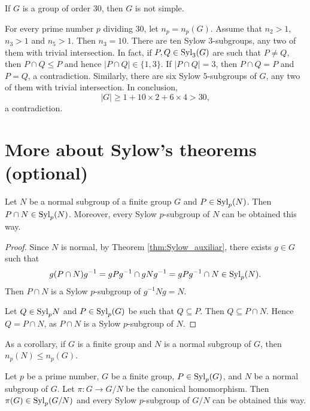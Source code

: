 \begin{example}
If $G$ is a group of order 30, then $G$ is not simple.

For every prime number $p$ dividing 30, let $n_p=n_p(G)$. Assume that
$n_2>1$, $n_3>1$ and $n_5>1$.
 Then $n_3=10$. There are ten 
Sylow $3$-subgroups, any two of them with trivial intersection. 
In fact, if $P,Q\in\mathrm{Syl}_3(G)$ are such that 
 $P\ne Q$, then $P\cap Q\leq P$ and hence 
$|P\cap Q|\in\{1,3\}$. If $|P\cap Q|=3$, then $P\cap Q=P$ and $P=Q$, a contradiction. Similarly, 
there are six Sylow $5$-subgroups of $G$, any two of them with 
trivial intersection. In conclusion,
\[
|G|\geq 1+10\times 2+6\times 4>30,
\]
a contradiction.
\end{example}


\section*{More about Sylow's theorems (optional)}

\begin{theorem}
    Let $N$ be a normal subgroup of a finite group 
    $G$ and $P\in\mathrm{Syl}_p(N)$. Then 
    $P\cap N\in\mathrm{Syl}_p(N)$. Moreover, every Sylow 
    $p$-subgroup of $N$  
    can be obtained this way. 
\end{theorem}

\begin{proof}
    Since $N$ is normal,
    by Theorem \ref{thm:Sylow_auxiliar}, there exists 
    $g\in G$ such that 
        \[
                g(P\cap N)g^{-1}=gPg^{-1}\cap gNg^{-1}=gPg^{-1}\cap N\in\mathrm{Syl}_p(N).
        \]
    Then $P\cap N$ is a Sylow $p$-subgroup of $g^{-1}Ng=N$.

    Let $Q\in\mathrm{Syl}_pN$ and $P\in\mathrm{Syl}_p(G)$ be such that
    $Q\subseteq P$. Then
    $Q\subseteq P\cap N$. Hence 
    $Q=P\cap N$, as $P\cap N$ is a Sylow $p$-subgroup of $N$. 
\end{proof}

As a corollary, if $G$ is a finite group and 
$N$ is a normal subgroup of $G$, then 
$n_p(N)\leq n_p(G)$.

\begin{theorem}
    Let $p$ be a prime number, $G$ be a finite group, $P\in\mathrm{Syl}_p(G)$, 
    and $N$ be a normal subgroup of $G$. Let $\pi\colon G\to G/N$ be the canonical homomorphism. Then 
    $\pi(G)\in\mathrm{Syl}_p(G/N)$ and every Sylow 
    $p$-subgroup of $G/N$ can be obtained this way. 
\end{theorem}

